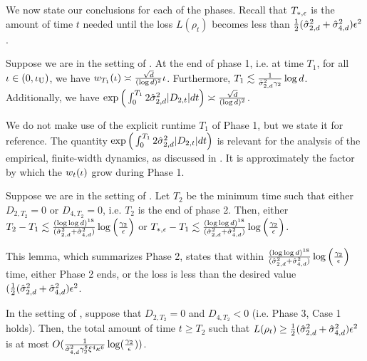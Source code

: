 We now state our conclusions for each of the phases. Recall that $T_{*, \epsilon}$ is the amount of time $t$ needed until the loss $L(\rho_t)$ becomes less than $\frac{1}{2} (\hat{\sigma}_{2, d}^2 + \hat{\sigma}_{4, d}^2) \epsilon^2$.

\begin{lemma}[Phase 1]
\label{lemma:phase_1_summary}
Suppose we are in the setting of . At the end of phase 1, i.e. at time $T_1$, for all $\iota \in (0, \iota_{\textup{U}})$, we have $w_{T_1}(\iota) \asymp \frac{\sqrt{d}}{(\log d)^2} \iota$. Furthermore, $T_1 \lesssim \frac{1}{\hat{\sigma}_{2, d}^2 \gamma_2} \log d$. Additionally, we have $\exp\Big(\int_0^{T_1} 2 \hat{\sigma}_{2, d}^2 |D_{2, t}| dt \Big) \asymp \frac{\sqrt{d}}{(\log d)^2}$.
\end{lemma}

We do not make use of the explicit runtime $T_1$ of Phase 1, but we state it for reference. The quantity $\exp\Big(\int_0^{T_1} 2 \hat{\sigma}_{2, d}^2 |D_{2, t}| dt \Big)$ is relevant for the analysis of the empirical, finite-width dynamics, as discussed in . It is approximately the factor by which the $w_t(\iota)$ grow during Phase 1.

\begin{lemma} [Phase 2] \label{lemma:phase_2_runtime}
Suppose we are in the setting of . Let $T_2$ be the minimum time such that either $D_{2, T_2} = 0$ or $D_{4, T_2} = 0$, i.e. $T_2$ is the end of phase 2. Then, either $T_2 - T_1 \lesssim \frac{(\log \log d)^{18}}{(\hat{\sigma}_{2, d}^2 + \hat{\sigma}_{4, d}^2)} \log\Big(\frac{\gamma_2}{\epsilon}\Big)$ or $T_{*, \epsilon} - T_1 \lesssim \frac{(\log \log d)^{18}}{(\hat{\sigma}_{2, d}^2 + \hat{\sigma}_{4, d}^2)} \log\Big(\frac{\gamma_2}{\epsilon}\Big)$.
\end{lemma}

This lemma, which summarizes Phase 2, states that within $\frac{(\log \log d)^{18}}{(\hat{\sigma}_{2, d}^2 + \hat{\sigma}_{4, d}^2)} \log\Big(\frac{\gamma_2}{\epsilon}\Big)$ time, either Phase 2 ends, or the loss is less than the desired value $(\frac{1}{2} (\hat{\sigma}_{2, d}^2 + \hat{\sigma}_{4, d}^2) \epsilon^2$.

\begin{lemma} \label{lemma:phase3_case1_final}
In the setting of , suppose that $D_{2, T_2} = 0$ and $D_{4, T_2} < 0$ (i.e. Phase 3, Case 1 holds). Then, the total amount of time $t \geq T_2$ such that $L(\rho_t) \geq \frac{1}{2} (\hat{\sigma}_{2, d}^2 + \hat{\sigma}_{4, d}^2) \epsilon^2$ is at most $O(\frac{1}{\hat{\sigma}_{4, d}^2 \gamma_2^8 \xi^4 \kappa^6} \log(\frac{\gamma_2}{\epsilon}))$.
\end{lemma}


